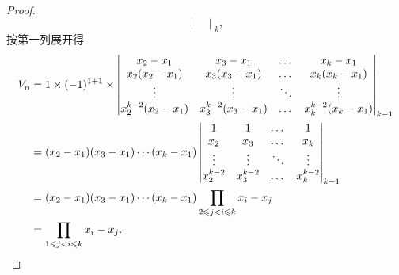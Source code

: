 \begin{example}
\begin{proof}
\[\begin{vmatrix}
\end{vmatrix}_k,
\]按第一列展开得\begin{align*}
V_n &= 1 \times (-1)^{1+1} \times \begin{vmatrix}
x_2 - x_1 & x_3 - x_1 & \dots & x_k - x_1 \\
x_2(x_2 - x_1) & x_3(x_3 - x_1) & \dots & x_k(x_k - x_1) \\
\vdots & \vdots & \ddots & \vdots \\
x_2^{k-2}(x_2 - x_1) & x_3^{k-2}(x_3 - x_1) & \dots & x_k^{k-2}(x_k - x_1) \\
\end{vmatrix}_{k-1} \\
&= (x_2 - x_1)(x_3 - x_1)\dotsm(x_k - x_1) \begin{vmatrix}
1 & 1 & \dots & 1 \\
x_2 & x_3 & \dots & x_k \\
\vdots & \vdots & \ddots & \vdots \\
x_2^{k-2} & x_3^{k-2} & \dots & x_k^{k-2} \\
\end{vmatrix}_{k-1} \\
&= (x_2 - x_1)(x_3 - x_1)\dotsm(x_k - x_1) \prod\limits_{2 \leqslant j < i \leqslant k}{x_i - x_j} \\
&= \prod\limits_{1 \leqslant j < i \leqslant k}{x_i - x_j}.
\qedhere
\end{align*}
\end{proof}
\end{example}


